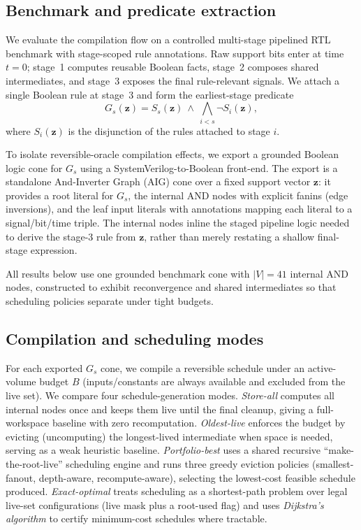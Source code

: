 \documentclass[conference]{IEEEtran}
\newcommand{\zvec}{\mathbf{z}}
\begin{document}
\subsection{Benchmark and predicate extraction}
\label{subsec:benchmark}

We evaluate the compilation flow on a controlled multi-stage pipelined RTL benchmark with stage-scoped rule annotations. Raw support bits enter at time $t{=}0$; stage~1 computes reusable Boolean facts, stage~2 composes shared intermediates, and stage~3 exposes the final rule-relevant signals. We attach a single Boolean rule at stage~3 and form the earliest-stage predicate
\[
G_s(\zvec)=S_s(\zvec)\ \wedge\ \bigwedge_{i<s}\neg S_i(\zvec),
\]
where $S_i(\zvec)$ is the disjunction of the rules attached to stage $i$.

To isolate reversible-oracle compilation effects, we export a grounded Boolean logic cone for $G_s$ using a SystemVerilog-to-Boolean front-end. The export is a standalone And-Inverter Graph (AIG) cone over a fixed support vector $\zvec$: it provides a root literal for $G_s$, the internal AND nodes with explicit fanins (edge inversions), and the leaf input literals with annotations mapping each literal to a signal/bit/time triple. The internal nodes inline the staged pipeline logic needed to derive the stage-3 rule from $\zvec$, rather than merely restating a shallow final-stage expression.

All results below use one grounded benchmark cone with $|V|=41$ internal AND nodes, constructed to exhibit reconvergence and shared intermediates so that scheduling policies separate under tight budgets.

\subsection{Compilation and scheduling modes}
\label{subsec:comp-modes}

For each exported $G_s$ cone, we compile a reversible schedule under an active-volume budget $B$ (inputs/constants are always available and excluded from the live set). We compare four schedule-generation modes. \emph{Store-all} computes all internal nodes once and keeps them live until the final cleanup, giving a full-workspace baseline with zero recomputation. \emph{Oldest-live} enforces the budget by evicting (uncomputing) the longest-lived intermediate when space is needed, serving as a weak heuristic baseline. \emph{Portfolio-best} uses a shared recursive ``make-the-root-live'' scheduling engine and runs three greedy eviction policies (smallest-fanout, depth-aware, recompute-aware), selecting the lowest-cost feasible schedule produced. \emph{Exact-optimal} treats scheduling as a shortest-path problem over legal live-set configurations (live mask plus a root-used flag) and uses \emph{Dijkstra's algorithm} to certify minimum-cost schedules where tractable.\cite{dijkstra1959note}
\end{document}

